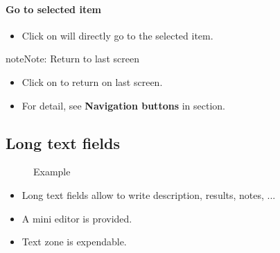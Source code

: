 \documentclass[letterpaper,10pt,english]{sphinxmanual}
\begin{document}
\paragraph{Go to selected item}
\begin{itemize}
\item {} 
Click on  will directly go to the selected item.

\end{itemize}

\begin{notice}{note}{Note:}
Return to last screen
\begin{itemize}
\item {} 
Click on  to return on last screen.

\item {} 
For detail, see \textbf{Navigation buttons} in {\hyperref[Gui:gui-top-bar-label]{\emph{}}} section.

\end{itemize}
\end{notice}
\newpage

\subsection{Long text fields}
\label{Gui:long-text-fields}\begin{figure}[htbp]
\centering
\capstart

\caption{Example}\end{figure}
\begin{itemize}
\item {} 
Long text fields allow to write description, results, notes, ...

\item {} 
A mini editor is provided.

\item {} 
Text zone is expendable.

\end{itemize}
\end{document}
